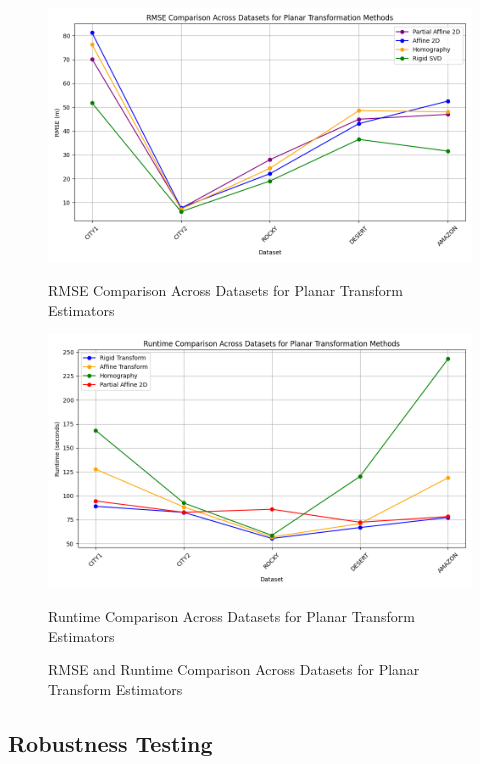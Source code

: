 \begin{figure}[H]
    \centering
    \begin{minipage}{0.45\textwidth}
        \centering
        \includegraphics[width=\textwidth]{./Chapter 4/testresults/rmse_planar_estimators.png}
        \caption{RMSE Comparison Across Datasets for Planar Transform Estimators}
    \end{minipage}\hfill
    \begin{minipage}{0.45\textwidth}
        \centering
        \includegraphics[width=\textwidth]{./Chapter 4/testresults/runtime_planar_estimators.png}
        \caption{Runtime Comparison Across Datasets for Planar Transform Estimators}
    \end{minipage}
    \caption{RMSE and Runtime Comparison Across Datasets for Planar Transform Estimators}
    \label{fig:rmse_runtime_comparison_rotestim}
\end{figure}
   
    

\subsection{Robustness Testing}

